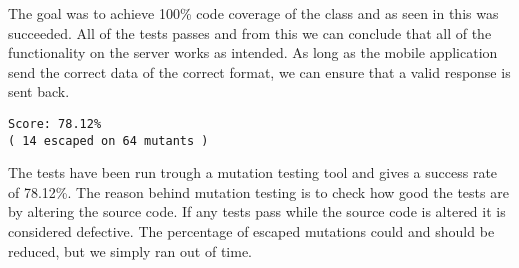 The goal was to achieve 100\% code coverage of the  class and as seen in  this was succeeded. All of the tests passes and from this we can conclude that all of the functionality on the server works as intended. As long as the mobile application send the correct data of the correct format, we can ensure that a valid response is sent back.

\begin{lstlisting}[numbers=none, basicstyle=\ttfamily, caption={The result of the Mutagenesis test}]
Score: 78.12%
( 14 escaped on 64 mutants )
\end{lstlisting}

The tests have been run trough a mutation testing tool and gives a success rate of 78.12\%. The reason behind mutation testing is to check how good the tests are by altering the source code. If any tests pass while the source code is altered it is considered defective. The percentage of escaped mutations could and should be reduced, but we simply ran out of time.


